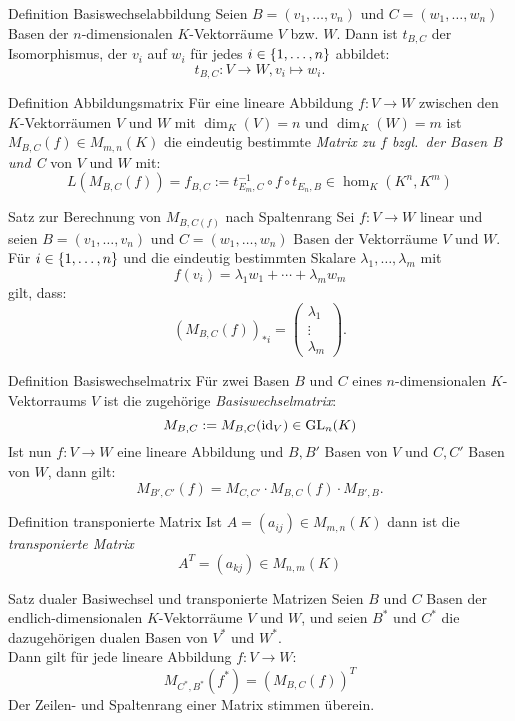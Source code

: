 \documentclass[main.tex]{subfiles}
\begin{document}
\begin{karte}{Definition Basiswechselabbildung}
    Seien \(B = (v_1, \ldots , v_n)\) und \(C = (w_1, \ldots , w_n)\)
    Basen der \(n\)-dimensionalen \(K\)-Vektorräume \(V\) bzw. \(W\).
    Dann ist \(t_{B,C}\) der Isomorphismus, der \(v_i\) auf \(w_i\) für 
    jedes \(i \in \{1, \ldots,n\}\) abbildet: 
    \[ t_{B,C}: V \rightarrow W, v_i \mapsto w_i. \]
\end{karte}
\begin{karte}{Definition Abbildungsmatrix}
    Für eine lineare Abbildung \(f:V \rightarrow W\) zwischen den
    \(K\)-Vektorräumen \(V\) und \(W\) mit \(\dim_K(V) = n\) und 
    \(\dim_K(W) = m\) ist \(M_{B,C}(f) \in M_{m,n}(K)\) die 
    eindeutig bestimmte \textit{Matrix zu \(f\) bzgl.\ der Basen 
    B und C} von \(V\) und \(W\) mit: 
    \[ L(M_{B,C}(f)) = f_{B,C} := t_{E_m,C}^{-1} \circ f \circ t_{E_n,B} 
    \in \hom_K(K^n,K^m)\] 
\end{karte}
\begin{karte}{Satz zur Berechnung von \(M_{B,C(f)}\) nach Spaltenrang}
    Sei \(f: V \rightarrow W\) linear und seien \(B = (v_1, \ldots ,v_n)\)
    und \(C = (w_1, \ldots , w_n)\) Basen der Vektorräume \(V\) und \(W\).
    Für \(i \in \{1,\ldots,n\}\) und die eindeutig bestimmten Skalare
    \(\lambda_1,\ldots,\lambda_m\) mit
    \[f(v_i) = \lambda_1w_1 + \cdots + \lambda_m w_m\]
    gilt, dass: 
    \[{(M_{B,C}(f))}_{*i} = 
    \begin{pmatrix}
        \lambda_1 \\
        \vdots \\
        \lambda_m
    \end{pmatrix}.\]
\end{karte}
\begin{karte}{Definition Basiswechselmatrix}
    Für zwei Basen \(B\) und \(C\) eines \(n\)-dimensionalen 
    \(K\)-Vektorraums \(V\) ist die zugehörige 
    \textit{Basiswechselmatrix}:
    \[M_{B,C} := M_{B,C}(\operatorname{id}_V) \in \operatorname{GL}_n(K) \]
    Ist nun \(f: V \rightarrow W\) eine lineare Abbildung und 
    \(B,B'\) Basen von \(V\) und \(C,C'\) Basen von \(W\), dann gilt:
    \[ M_{B',C'}(f) = M_{C,C'} \cdot M_{B,C}(f) \cdot M_{B',B}. \]
\end{karte}
\begin{karte}{Definition transponierte Matrix}
    Ist \(A = (a_{ij}) \in M_{m,n}(K)\) dann ist die \textit{transponierte Matrix}
    \[ A^T  = (a_{kj}) \in M_{n,m}(K) \]
\end{karte}
\begin{karte}{Satz dualer Basiwechsel und transponierte Matrizen}
    Seien \(B\) und \(C\) Basen der endlich-dimensionalen 
    \(K\)-Vektorräume \(V\) und \(W\), und seien \(B^*\) und \(C^*\)
    die dazugehörigen dualen Basen von \(V^*\) und \(W^*\).\\
    Dann gilt für jede lineare Abbildung \(f: V \rightarrow W\):
    \[M_{C^*,B^*}(f^*) = {(M_{B,C}(f))}^T\]
    Der Zeilen- und Spaltenrang einer Matrix stimmen überein.
\end{karte}
\end{document}
